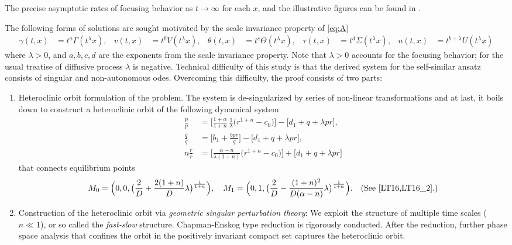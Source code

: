 \documentclass[a4paper,11pt]{article}
\def\dpp{\dot{p}}
\def\dqq{\dot{q}}
\def\drr{\dot{r}}
\begin{document}
The precise asymptotic rates of focusing behavior as $t \rightarrow \infty$ for each $x$, and the illustrative figures can be found in \cite{KLT_2016,LT16,LT16_2}.

The following forms of solutions are sought motivated by the scale invariance property of \eqref{eq:A}
\begin{align*}
 \gamma(t,x) &= t^a\Gamma(t^\lambda x), & v(t,x) &= t^b V(t^\lambda x), &\theta(t,x) &= t^c \Theta(t^\lambda x), &
 \tau(t,x) &= t^d \Sigma(t^\lambda x), & u(t,x) &= t^{b+\lambda} U(t^\lambda x)
\end{align*}
where $\lambda>0$, and $a,b,c,d$ are the exponents from the scale invariance property. Note that $\lambda>0$ accounts for the focusing behavior; for the usual treatise of diffusive process $\lambda$ is negative. Technical difficulty of this study is that the derived system for the self-similar ansatz consists of singular and non-autonomous odes. Overcoming this difficulty, the proof consists of two parts:
\begin{enumerate}
 \item Heteroclinic orbit formulation of the problem. The system is de-singularized  by series of non-linear transformations and at last, it boils down to construct a heteroclinic orbit of the following dynamical system
\begin{equation} \label{eq:pqrsys}\tag{P}
\begin{aligned}
 \frac{\dpp}{p}&=\Big[\frac{1+\alpha}{1+n}\,\frac{1}{\lambda }\Big(r^{1+n}-c_0\Big)\Big] -\Big[d_1 + q + \lambda pr\Big],\\
 \frac{\dqq}{q}&=\Big[b_1 +\frac{bpr}{q}\Big] -\Big[d_1 + q + \lambda pr\Big],\\
 n\frac{\drr}{r}&=\Big[\frac{\alpha-n}{\lambda(1+n)}\Big(r^{1+n}-c_0\Big)\Big]+\Big[d_1 + q + \lambda pr\Big]
\end{aligned}
\end{equation}
that connects equilibrium points
\begin{align*}
 M_0=\Big(0,0,\big(\frac{2}{D} + \frac{2(1+n)}{D} \lambda\big)^{\frac{1}{1+n}}\Big), \quad M_1=\Big(0,1,\big(\frac{2}{D} -\frac{(1+n)^2}{D(\alpha-n)} \lambda\big)^{\frac{1}{1+n}}\Big). \quad\text{(See \cite{LT16,LT16_2}.)}
\end{align*}
 \item Construction of the heteroclinic orbit via {\it geometric singular perturbation theory}: We exploit the structure of multiple time scales ($n\ll1$), or so called the {\it fast-slow} structure. Chapman-Enskog type reduction is rigorously conducted. After the reduction, further phase space analysis that confines the orbit in the positively invariant compact set captures the heteroclinic orbit.
\end{enumerate}
\end{document}
